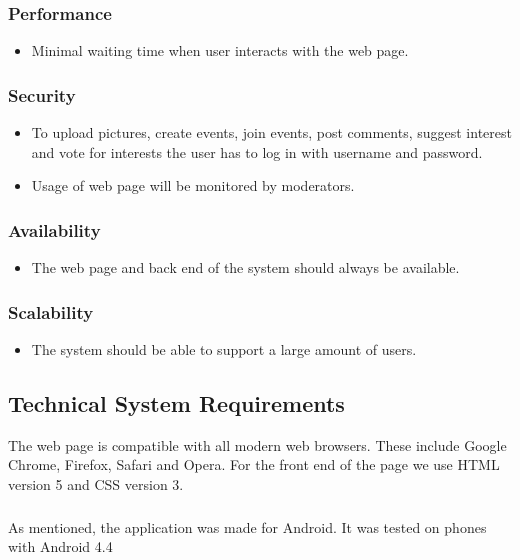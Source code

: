\subsubsection{Performance}
\begin{itemize}
    \item Minimal waiting time when user interacts with the web page.
\end{itemize}

\subsubsection{Security}
\begin{itemize}
    \item To upload pictures, create events, join events, post comments, suggest interest and vote for interests the user has to log in with username and password.
    \item Usage of web page will be monitored by moderators.
\end{itemize}

\subsubsection{Availability}
\begin{itemize}
    \item The web page and back end of the system should always be available.
\end{itemize}

\subsubsection{Scalability}
\begin{itemize}
    \item The system should be able to support a large amount of users.
\end{itemize}

\subsection{Technical System Requirements}
\label{subsec:SysReqReqsTechnical}
The web page is compatible with all modern web browsers. These include Google Chrome, Firefox, Safari and Opera. For the front end of the page we use HTML version 5 and CSS version 3.

\subparagraph{} As mentioned, the application was made for Android. It was tested on phones with Android 4.4

